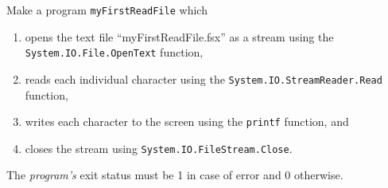 Make a program \lstinline{myFirstReadFile} which
\begin{enumerate}
\item opens the text file ``myFirstReadFile.fsx'' as a stream using the
  \lstinline{System.IO.File.OpenText} function,
\item reads each individual character using the
  \lstinline{System.IO.StreamReader.Read} function,
\item writes each character to the screen using the \lstinline{printf}
  function, and
\item closes the stream using \lstinline{System.IO.FileStream.Close}.
\end{enumerate}
The \emph{program's} exit status must be 1 in case of error and 0 otherwise.
